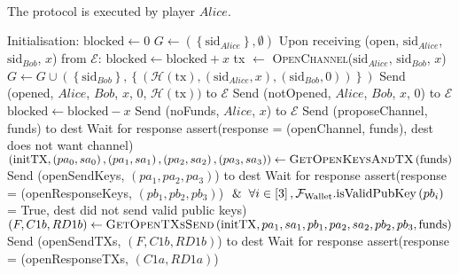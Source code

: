 \ \\  The protocol is executed by player $Alice$.
  \label{alg:lightningprot}
  \begin{algorithmic}[1]
    \State Initialisation:
      \State $\mathrm{blocked} \leftarrow 0$
      \State $G \leftarrow \left(\left\{\mathrm{sid}_{Alice}\right\}, \emptyset\right)$
    \State
    \State Upon receiving (open, $\mathrm{sid}_{Alice}$, $\mathrm{sid}_{Bob}$, $x$) from
    $\mathcal{E}$:
        \State $\mathrm{blocked} \leftarrow \mathrm{blocked} + x$
        \State tx $\gets$ \textsc{OpenChannel}($\mathrm{sid}_{Alice}$,
        $\mathrm{sid}_{Bob}$, $x$)
          \State $G \leftarrow G \cup \left(\left\{\mathrm{sid}_{Bob}\right\},
          \left\{\left(\mathcal{H}\left(\mathrm{tx}\right), \left(\mathrm{sid}_{Alice},
          x\right), \left(\mathrm{sid}_{Bob}, 0\right)\right)\right\}\right)$
          \State Send (opened, $Alice$, $Bob$, $x$, 0,
          $\mathcal{H}\left(\mathrm{tx}\right))$ to $\mathcal{E}$
        \Else
          \State Send (notOpened, $Alice$, $Bob$, $x$, 0) to $\mathcal{E}$
        \EndIf
        \State $\mathrm{blocked} \leftarrow \mathrm{blocked} - x$
      \Else
        \State Send (noFunds, $Alice$, $x$) to $\mathcal{E}$
      \EndIf
    \State
      \State Send (proposeChannel, funds) to dest
      \State Wait for response
      \State assert(response = (openChannel, funds),
      \Indent
        \State dest does not want channel)
      \EndIndent
      \State $\left(\mathrm{initTX}, \left(pa_0, sa_0\right), \left(pa_1, sa_1\right),
      \left(pa_2, sa_2\right), \left(pa_3, sa_3\right)\right) \gets
      \textsc{GetOpenKeysAndTX}\left(\mathrm{funds}\right)$
      \State Send (openSendKeys, $\left(pa_1, pa_2, pa_3\right)$) to dest
      \State Wait for response
      \State assert(response = (openResponseKeys, $\left(pb_1, pb_2, pb_3\right)$)
      \Indent
        \State $\And \forall i \in \left[3\right],
        \mathcal{F}_{\mathrm{Wallet}}.\mathrm{isValidPubKey}\left(pb_i\right)$ = True,
        \State dest did not send valid public keys)
      \EndIndent
      \State $\left(F, C1b, RD1b\right) \gets
      \textsc{GetOpenTXsSend}\left(\mathrm{initTX}, pa_1, sa_1, pb_1, pa_2, sa_2,
      pb_2, pb_3, \mathrm{funds}\right)$
      \State Send (openSendTXs, $\left(F, C1b, RD1b\right)$) to dest
      \State Wait for response
      \State assert(response = (openResponseTXs, $\left(C1a, RD1a\right)$)

\end{algorithmic}

